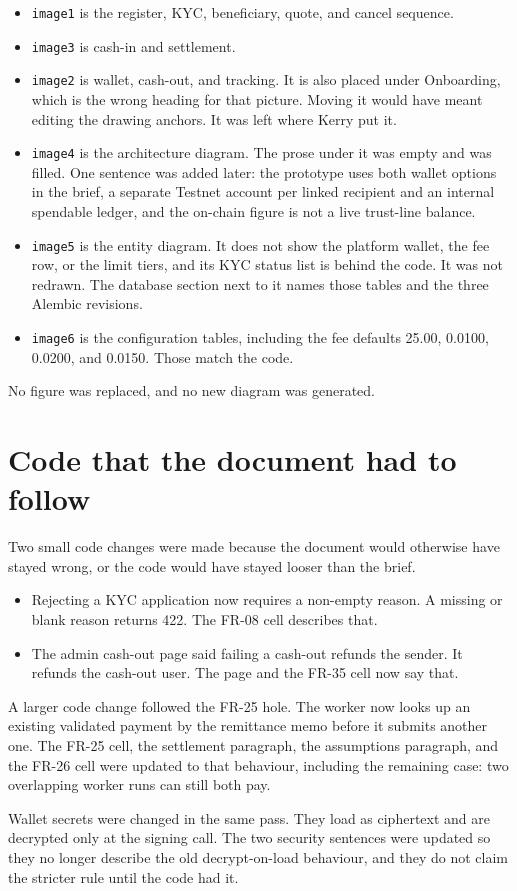 \documentclass[11pt,a4paper]{article}
\begin{document}
\begin{itemize}
\item \texttt{image1} is the register, KYC, beneficiary, quote, and cancel sequence.
\item \texttt{image3} is cash-in and settlement.
\item \texttt{image2} is wallet, cash-out, and tracking.
It is also placed under Onboarding, which is the wrong heading for that picture.
Moving it would have meant editing the drawing anchors.
It was left where Kerry put it.
\item \texttt{image4} is the architecture diagram.
The prose under it was empty and was filled.
One sentence was added later: the prototype uses both wallet options in the brief, a separate Testnet account per linked recipient and an internal spendable ledger, and the on-chain figure is not a live trust-line balance.
\item \texttt{image5} is the entity diagram.
It does not show the platform wallet, the fee row, or the limit tiers, and its KYC status list is behind the code.
It was not redrawn.
The database section next to it names those tables and the three Alembic revisions.
\item \texttt{image6} is the configuration tables, including the fee defaults 25.00, 0.0100, 0.0200, and 0.0150.
Those match the code.
\end{itemize}

No figure was replaced, and no new diagram was generated.

\section{Code that the document had to follow}

Two small code changes were made because the document would otherwise have stayed wrong, or the code would have stayed looser than the brief.

\begin{itemize}
\item Rejecting a KYC application now requires a non-empty reason.
A missing or blank reason returns 422.
The FR-08 cell describes that.
\item The admin cash-out page said failing a cash-out refunds the sender.
It refunds the cash-out user.
The page and the FR-35 cell now say that.
\end{itemize}

A larger code change followed the FR-25 hole.
The worker now looks up an existing validated payment by the remittance memo before it submits another one.
The FR-25 cell, the settlement paragraph, the assumptions paragraph, and the FR-26 cell were updated to that behaviour, including the remaining case: two overlapping worker runs can still both pay.

Wallet secrets were changed in the same pass.
They load as ciphertext and are decrypted only at the signing call.
The two security sentences were updated so they no longer describe the old decrypt-on-load behaviour, and they do not claim the stricter rule until the code had it.
\end{document}
